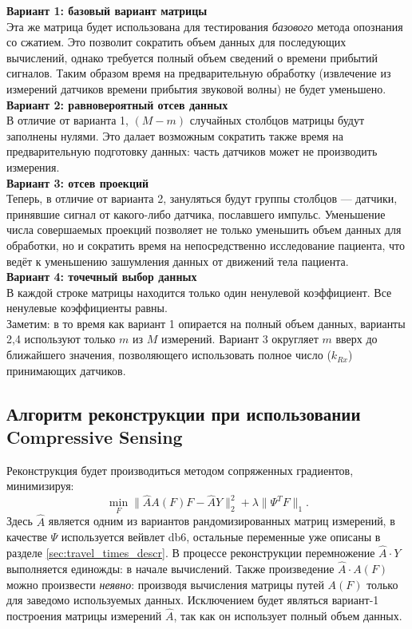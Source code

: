\documentclass[14pt]{matmex-diploma}
\begin{document}
\textbf{Вариант 1: базовый вариант матрицы}\\

Эта же матрица будет использована для тестирования \textit{базового} метода опознания со сжатием. Это позволит сократить объем данных для последующих вычислений, однако требуется полный объем сведений о времени прибытий сигналов. Таким образом время на предварительную обработку (извлечение из измерений датчиков времени прибытия звуковой волны) не будет уменьшено.\\

\textbf{Вариант 2: равновероятный отсев данных}\\

В отличие от варианта 1, $(M-m)$ случайных столбцов матрицы будут заполнены нулями. Это далает возможным сократить также время на предварительную подготовку данных: часть датчиков может не производить измерения.\\

\textbf{Вариант 3: отсев проекций}\\

Теперь, в отличие от варианта 2, зануляться будут группы столбцов --- датчики, принявшие сигнал от какого-либо датчика, пославшего импульс. Уменьшение числа совершаемых проекций позволяет не только уменьшить объем данных для обработки, но и сократить время на непосредственно исследование пациента, что ведёт к уменьшению зашумления данных от движений тела пациента. \\

\textbf{Вариант 4: точечный выбор данных}\\

В каждой строке матрицы находится только один ненулевой коэффициент. Все ненулевые коэффициенты равны. \\

Заметим: в то время как вариант 1 опирается на полный объем данных, варианты 2,4 используют только $m \text{ из } M$ измерений. Вариант 3 округляет $m$ вверх до ближайшего значения, позволяющего использовать полное число ($k_{Rx}$) принимающих датчиков.

\subsection{Алгоритм реконструкции при использовании Com\-pres\-sive Sensing} \label{sec:recon_algo}
Реконструкция будет производиться методом сопряженных градиентов, минимизируя:
\begin{equation}
\label{eq:conj_cs}
\min_F \| \hat{A} A(F) F - \hat{A}Y \|_2^2 + \lambda \| \Psi^T F \|_1.
\end{equation}
Здесь $\hat{A}$ является одним из вариантов рандомизированных матриц измерений, в качестве $\Psi$ используется вейвлет db6, остальные переменные уже описаны в разделе \ref{sec:travel_times_descr}. 
В процессе реконструкции перемножение $\hat{A}\cdot Y$ выполняется единожды: в начале вычислений. Также произведение $\hat{A} \cdot A(F)$ можно произвести \textit{неявно}: производя вычисления матрицы путей $A(F)$ только для заведомо используемых данных. Исключением будет являться вариант-1 построения матрицы измерений $\hat{A}$, так как он использует полный объем данных.
\end{document}
